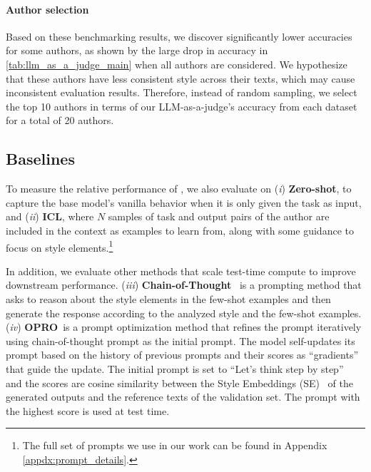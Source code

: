 \paragraph{Author selection} 
Based on these benchmarking results, 
we discover significantly lower accuracies for some authors, as shown by the large drop in accuracy in \autoref{tab:llm_as_a_judge_main} when all authors are considered. 
We hypothesize that these authors have less consistent style across their texts, which may cause inconsistent evaluation results. Therefore, instead of random sampling, we select the top 10 authors in terms of our LLM-as-a-judge's accuracy from each dataset for a total of 20 authors. 
 




\subsection{Baselines}
\label{sec:baselines}

To measure the relative performance of \ours, we also evaluate on 
(\textit{i})\textbf{ Zero-shot},  to capture the base model's vanilla behavior when it is only given the task as input, and 
(\textit{ii}) \textbf{ICL}, where $N$ samples of task and output pairs of the author are included in the context as examples to learn from, along with some guidance to focus on style elements.\footnote{The full set of prompts we use in our work can be found in Appendix \ref{appdx:prompt_details}.} 

In addition, we evaluate other methods that scale test-time compute to improve downstream performance. 
(\textit{iii}) \textbf{Chain-of-Thought}~\cite{wei2022chain} is a prompting method that asks to reason about the style elements in the few-shot examples and then generate the response according to the analyzed style and the few-shot examples.  
(\textit{iv}) \textbf{OPRO}~\cite{yang2024large}is a prompt optimization method that refines the prompt iteratively using chain-of-thought prompt as the initial prompt. The model self-updates its prompt based on the history of previous prompts and their scores as ``gradients'' that guide the update. 
The initial prompt is set to ``Let's think step by step''~\cite{kojima2022large} and the scores are cosine similarity between the Style Embeddings (SE)~\cite{wegmann-etal-2022-author} of the generated outputs and the reference texts of the validation set. 
The prompt with the highest score is used at test time. 



